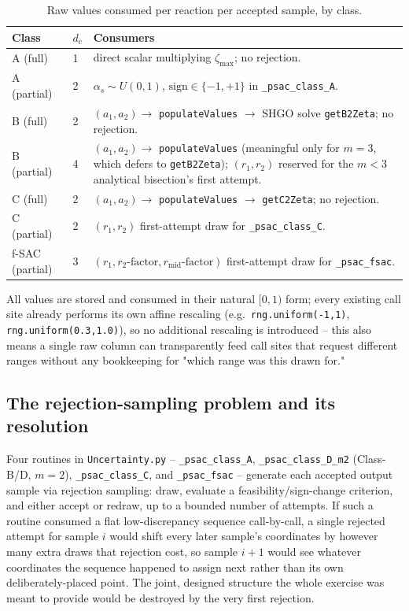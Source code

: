 \documentclass[11pt]{article}
\newcommand{\code}[1]{\texttt{#1}}
\begin{document}
\begin{table}[h]
\centering
\caption{Raw values consumed per reaction per accepted sample, by class.}
\label{tab:dims}
\begin{tabular}{@{}llp{8.5cm}@{}}
\toprule
Class & $d_c$ & Consumers \\
\midrule
A (full) & 1 & direct scalar multiplying $\zeta_{\max}$; no rejection. \\
A (partial) & 2 & $\alpha_s\!\sim\!U(0,1)$, $\mathrm{sign}\!\in\!\{-1,+1\}$ in \code{\_psac\_class\_A}. \\
B (full) & 2 & $(a_1,a_2) \to$ \code{populateValues} $\to$ SHGO solve \code{getB2Zeta}; no rejection. \\
B (partial) & 4 & $(a_1,a_2)\to$ \code{populateValues} (meaningful only for $m=3$, which defers to \code{getB2Zeta}); $(r_1,r_2)$ reserved for the $m{<}3$ analytical bisection's first attempt. \\
C (full) & 2 & $(a_1,a_2) \to$ \code{populateValues} $\to$ \code{getC2Zeta}; no rejection. \\
C (partial) & 2 & $(r_1,r_2)$ first-attempt draw for \code{\_psac\_class\_C}. \\
f-SAC (partial) & 3 & $(r_1, r_2\text{-factor}, r_{\mathrm{mid}}\text{-factor})$ first-attempt draw for \code{\_psac\_fsac}. \\
\bottomrule
\end{tabular}
\end{table}

All values are stored and consumed in their natural $[0,1)$ form; every existing call site already performs its own affine rescaling (e.g.\ \code{rng.uniform(-1,1)}, \code{rng.uniform(0.3,1.0)}), so no additional rescaling is introduced -- this also means a single raw column can transparently feed call sites that request different ranges without any bookkeeping for "which range was this drawn for."

\subsection{The rejection-sampling problem and its resolution}
\label{sec:rejection}

Four routines in \code{Uncertainty.py} -- \code{\_psac\_class\_A}, \code{\_psac\_class\_D\_m2} (Class-B/D, $m=2$), \code{\_psac\_class\_C}, and \code{\_psac\_fsac} -- generate each accepted output sample via rejection sampling: draw, evaluate a feasibility/sign-change criterion, and either accept or redraw, up to a bounded number of attempts. If such a routine consumed a flat low-discrepancy sequence call-by-call, a single rejected attempt for sample $i$ would shift every later sample's coordinates by however many extra draws that rejection cost, so sample $i+1$ would see whatever coordinates the sequence happened to assign next rather than its own deliberately-placed point. The joint, designed structure the whole exercise was meant to provide would be destroyed by the very first rejection.
\end{document}
